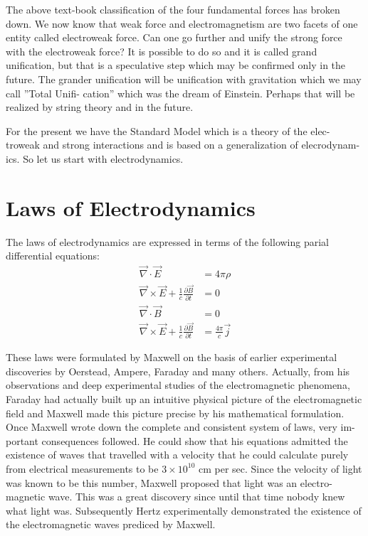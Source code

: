 The above text-book classification of the four fundamental forces has broken
down. We now know that weak force and electromagnetism are two facets of one
entity called electroweak force. Can one go further and unify the strong force with
the electroweak force? It is possible to do so and it is called grand unification, but
that is a speculative step which may be confirmed only in the future. The grander
unification will be unification with gravitation which we may call ”Total Unifi-
cation” which was the dream of Einstein. Perhaps that will be realized by string
theory and in the future.


For the present we have the Standard Model which is a theory of the elec-
troweak and strong interactions and is based on a generalization of elecrodynam-
ics. So let us start with electrodynamics.


\section*{Laws of Electrodynamics}

The laws of electrodynamics are expressed in terms of the following parial
differential equations:
\begin{align*}
\vec{\nabla} \cdot \vec{E} &= 4 \pi \rho\\
\vec{\nabla} \times \vec{E} + \frac{1}{c} \frac{\partial \vec{B}}{\partial t} &=0\\
\vec{\nabla} \cdot \vec{B} &= 0\\
\vec{\nabla} \times \vec{E} + \frac{1}{c} \frac{\partial \vec{B}}{\partial t} &= \frac{4\pi}{c} \vec{j}
\end{align*}

These laws were formulated by Maxwell on the basis of earlier experimental
discoveries by Oerstead, Ampere, Faraday and many others. Actually, from his
observations and deep experimental studies of the electromagnetic phenomena, Faraday had actually built up an intuitive physical picture of the electromagnetic
field and Maxwell made this picture precise by his mathematical formulation.
Once Maxwell wrote down the complete and consistent system of laws, very im-
portant consequences followed. He could show that his equations admitted the
existence of waves that travelled with a velocity that he could calculate purely
from electrical measurements to be $3 \times 10^{10}$ cm per sec. Since the velocity of
light was known to be this number, Maxwell proposed that light was an electro-
magnetic wave. This was a great discovery since until that time nobody knew
what light was. Subsequently Hertz experimentally demonstrated the existence of
the electromagnetic waves prediced by Maxwell.

